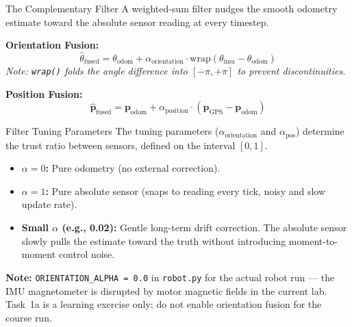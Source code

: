 \documentclass{beamer}
\begin{document}
\begin{frame}{The Complementary Filter}
    A weighted-sum filter nudges the smooth odometry estimate toward the absolute sensor reading at every timestep.
    \vspace{0.5cm}
    
    \textbf{Orientation Fusion:}
    \begin{equation*}
        \hat{\theta}_{\text{fused}} = \theta_{\text{odom}} + \alpha_{\text{orientation}} \cdot \text{wrap}(\theta_{\text{imu}} - \theta_{\text{odom}})
    \end{equation*}
    \textit{Note: \texttt{wrap()} folds the angle difference into $[-\pi, +\pi]$ to prevent discontinuities.}
    
    \vspace{0.5cm}
    \textbf{Position Fusion:}
    \begin{equation*}
        \hat{\mathbf{p}}_{\text{fused}} = \mathbf{p}_{\text{odom}} + \alpha_{\text{position}} \cdot (\mathbf{p}_{\text{GPS}} - \mathbf{p}_{\text{odom}})
    \end{equation*}
\end{frame}

\begin{frame}{Filter Tuning Parameters}
    The tuning parameters ($\alpha_{\text{orientation}}$ and $\alpha_{\text{pos}}$) determine the trust ratio between sensors, defined on the interval $[0,1]$.

    \vspace{0.3cm}
    \begin{itemize}
        \item \textbf{$\alpha = 0$:} Pure odometry (no external correction).
        \item \textbf{$\alpha = 1$:} Pure absolute sensor (snaps to reading every tick, noisy and slow update rate).
        \item \textbf{Small $\alpha$ (e.g., 0.02):} Gentle long-term drift correction. The absolute sensor slowly pulls the estimate toward the truth without introducing moment-to-moment control noise.
    \end{itemize}

    \vspace{0.3cm}
    \textbf{Note:} \texttt{ORIENTATION\_ALPHA = 0.0} in \texttt{robot.py} for the actual robot run --- the IMU magnetometer is disrupted by motor magnetic fields in the current lab.  Task~1a is a learning exercise only; do not enable orientation fusion for the course run.
\end{frame}
\end{document}
